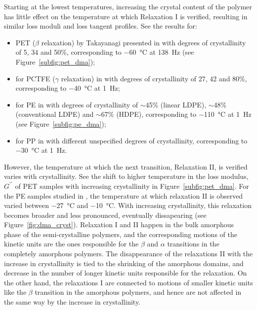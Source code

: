 Starting at the lowest temperatures, increasing the crystal content of the polymer has little effect on the temperature at which Relaxation I is verified, resulting in similar loss moduli and loss tangent profiles.
See the results for:
\begin{itemize}
    \item PET ($\beta$ relaxation) by Takayanagi presented in \cite{wardIntroductionMechanicalProperties2004} with degrees of crystallinity of 5, 34 and 50\%, corresponding to \SI{-60}{\celsius} at \SI{138}{\hertz} (see Figure~\ref{subfig:pet_dma});
    \item for PCTFE ($\gamma$ relaxation) in \cite{mccrumVariationInternalFriction1962} with degrees of crystallinity of 27, 42 and 80\%, corresponding to \SI{-40}{\celsius} at \SI{1}{\hertz};
    \item for PE in \cite{khannaDynamicMechanicalRelaxations1985} with degrees of crystallinity of $\sim$45\% (linear LDPE), $\sim$48\% (conventional LDPE) and $\sim$67\% (HDPE), corresponding to \SI{-110}{\celsius} at \SI{1}{\hertz} (see Figure~\ref{subfig:pe_dma});
    \item for PP in \cite{mccrumStudyInternalFriction1959} with different unspecified degrees of crystallinity, corresponding to \SI{-30}{\celsius} at \SI{1}{\hertz}.
\end{itemize}

However, the temperature at which the next transition, Relaxation II, is verified varies with crystallinity.
See the shift to higher temperature in the loss modulus, $G^{\prime\prime}$ of PET samples with increasing crystallinity in Figure~\ref{subfig:pet_dma}.
For the PE samples studied in \cite{khannaDynamicMechanicalRelaxations1985}, the temperature at which relaxation II is observed varied between \SI{-27}{\celsius} and \SI{-10}{\celsius}.
With increasing crystallinity, this relaxation becomes broader and less pronounced, eventually dissapearing (see Figure~\ref{fig:dma_cryst}).
Relaxation I and II happen in the bulk amorphous phase of the semi-crystalline polymers, and the corresponding motions of the kinetic units are the ones responsible for the $\beta$ and $\alpha$ transitions in the completely amorphous polymers.
The disappearance of the relaxations II with the increase in crystallinity is tied to the shrinking of the amorphous domains, and decrease in the number of longer kinetic units responsible for the relaxation.
On the other hand, the relaxations I are connected to motions of smaller kinetic units like the $\beta$ transition in the amorphous polymers, and hence are not affected in the same way by the increase in crystallinity.

